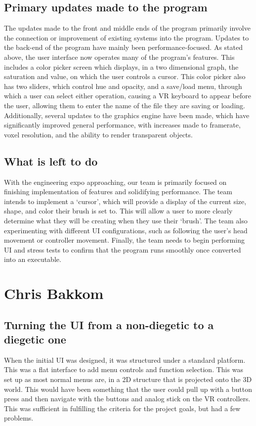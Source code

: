 \documentclass[onecolumn, draftclsnofoot,10pt, compsoc]{IEEEtran}
\begin{document}
\subsection{Primary updates made to the program}
The updates made to the front and middle ends of the program primarily involve the connection or improvement of existing systems into the program. Updates to the back-end of the program have mainly been performance-focused. As stated above, the user interface now operates many of the program’s features. This includes a color picker screen which displays, in a two dimensional graph, the saturation and value, on which the user controls a cursor. This color picker also has two sliders, which control hue and opacity, and a save/load menu, through which a user can select either operation, causing a VR keyboard to appear before the user, allowing them to enter the name of the file they are saving or loading. Additionally, several updates to the graphics engine have been made, which have significantly improved general performance, with increases made to framerate, voxel resolution, and the ability to render transparent objects. 

\subsection{What is left to do}
With the engineering expo approaching, our team is primarily focused on finishing implementation of features and solidifying performance. The team intends to implement a ‘cursor’, which will provide a display of the current size, shape, and color their brush is set to. This will allow a user to more clearly determine what they will be creating when they use their ‘brush’. The team also experimenting with different UI configurations, such as following the user’s head movement or controller movement. Finally, the team needs to begin performing UI and stress tests to confirm that the program runs smoothly once converted into an executable.


\section{Chris Bakkom}



\subsection{Turning the UI from a non-diegetic to a diegetic one}
When the initial UI was designed, it was structured under a standard platform. This was a flat interface to add menu controls and function selection. This was set up as most normal menus are, in a 2D structure that is projected onto the 3D world. This would have been something that the user could pull up with a button press and then navigate with the buttons and analog stick on the VR controllers. This was sufficient in fulfilling the criteria for the project goals, but had a few problems.
\end{document}
